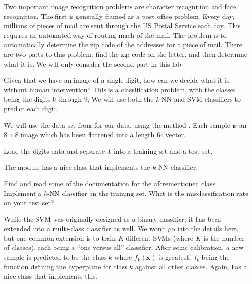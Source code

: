 
Two important image recognition problems are character recognition and face recognition. The first is generally framed as a post office problem. Every day, millions of pieces of mail are sent through the US Postal Service each day. This requires an automated way of routing much of the mail. The problem is to automatically determine the zip code of the addressee for a piece of mail. There are two parts to this problem: find the zip code on the letter, and then determine what it is. We will only consider the second part in this lab.

Given that we have an image of a single digit, how can we decide what it is without human intervention? This is a classification problem, with the classes being the digits $0$ through $9$. We will use both the $k$-NN and SVM classifiers to predict each digit.

We will use the  data set from  for our data, using the method . Each sample is an $8 \times 8$ image which has been flattened into a length $64$ vector.

\begin{problem}
Load the digits data and separate it into a training set and a test set.
\end{problem}

The module  has a nice class  that implements the $k$-NN classifier.

\begin{problem}
Find and read some of the documentation for the aforementioned class. Implement a $k$-NN classifier on the training set. What is the misclassification rate on your test set?
\end{problem}

While the SVM was originally designed as a binary classifier, it has been extended into a multi-class classifier as well. We won't go into the details here, but one common extension is to train $K$ different SVMs (where $K$ is the number of classes), each being a ``one-versus-all'' classifier. After some calibration, a new sample is predicted to be the class $k$ where $f_{k}(\mathbf{x})$ is greatest, $f_{k}$ being the function defining the hyperplane for class $k$ against all other classes. Again,  has a nice class  that implements this.

